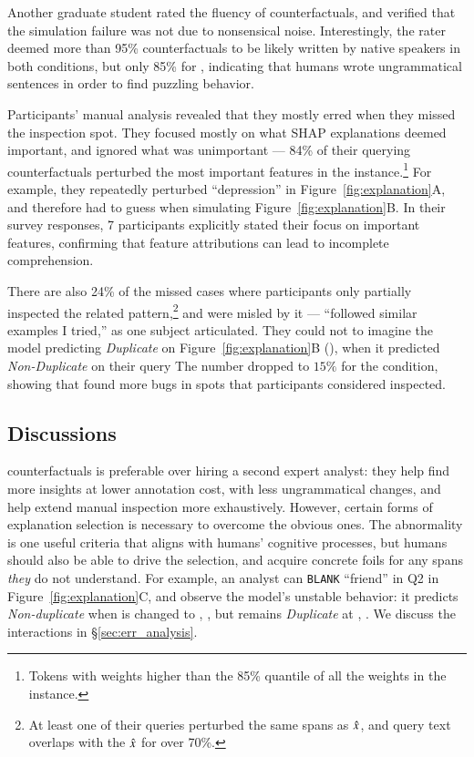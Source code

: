 Another graduate student rated the fluency of counterfactuals, and verified that the simulation failure was not due to nonsensical noise.
Interestingly, the rater deemed more than 95\% counterfactuals to be likely written by native speakers in both \sysname conditions, but only 85\% for \chuman, indicating that humans wrote ungrammatical sentences in order to find puzzling behavior.

Participants' manual analysis revealed that they mostly erred when they missed the inspection spot.
They focused mostly on what SHAP explanations deemed important, and ignored what was unimportant --- 84\% of their querying counterfactuals perturbed the most important features in the instance.\footnote{Tokens with weights higher than the 85\% quantile of all the weights in the instance.}
For example, they repeatedly perturbed ``depression'' in Figure~\ref{fig:explanation}A, and therefore had to guess when simulating Figure~\ref{fig:explanation}B.
In their survey responses, 7 participants explicitly stated their focus on important features, confirming that feature attributions can lead to incomplete comprehension.

There are also 24\% of the missed \cshap cases where participants only partially inspected the related pattern,\footnote{At least one of their queries perturbed the same spans as $\hat{x}$, and query text overlaps with the $\hat{x}$ for over 70\%.} and were misled by it --- ``followed similar examples I tried,'' as one subject articulated.
They could not to imagine the model predicting \emph{Duplicate} on Figure~\ref{fig:explanation}B (), when it predicted \emph{Non-Duplicate} on their query 
The number dropped to $15\%$ for the \chuman condition, showing that \cshap found more bugs in spots that participants considered inspected.

\subsection{Discussions}

\sysname counterfactuals is preferable over hiring a second expert analyst: they help find more insights at lower annotation cost, with less ungrammatical changes, and help extend manual inspection more exhaustively.
However, certain forms of explanation selection is necessary to overcome the obvious ones. 
The abnormality is one useful criteria that aligns with humans' cognitive processes, but humans should also be able to drive the selection, and acquire concrete foils for any spans \emph{they} do not understand.
For example, an analyst can \texttt{BLANK} ``friend'' in Q2 in Figure~\ref{fig:explanation}C, and observe the model's unstable behavior: it predicts \emph{Non-duplicate} when  is changed to , , but remains \emph{Duplicate} at , .
We discuss the interactions in \S\ref{sec:err_analysis}.

